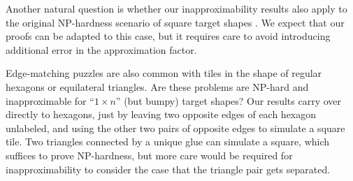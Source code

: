 \documentclass[11pt]{article}
\def\MPC{\mathrm{MPC}}
\newcommand{\TODO}[1]{{\color{xxxcolor}{[}\emph{#1}{]}}}
\begin{document}

Another natural question is whether our inapproximability results also apply to
the original NP-hardness scenario of square target shapes \cite{Jigsaw_GC}.
We expect that our proofs can be adapted to this case, but it requires care to
avoid introducing additional error in the approximation factor.

Edge-matching puzzles are also common with tiles in the shape of regular
hexagons or equilateral triangles.  Are these problems are NP-hard and
inapproximable for ``$1 \times n$'' (but bumpy) target shapes?  Our results
carry over directly to hexagons, just by leaving two opposite edges of each
hexagon unlabeled, and using the other two pairs of opposite edges to simulate
a square tile.  Two triangles connected by a unique glue can simulate a square,
which suffices to prove NP-hardness, but more care would be required for
inapproximability to consider the case that the triangle pair gets separated.



\end{document}
